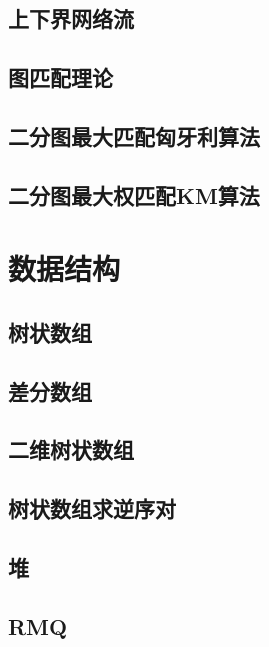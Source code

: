 \section{上下界网络流}
\raggedbottom
\hrulefill
\section{图匹配理论}
\raggedbottom
\hrulefill
\section{二分图最大匹配匈牙利算法}
\raggedbottom
\hrulefill
\section{二分图最大权匹配KM算法}
\raggedbottom
\hrulefill

\chapter{数据结构}
\section{树状数组}
\raggedbottom
\hrulefill
\section{差分数组}
\raggedbottom
\hrulefill
\section{二维树状数组}
\raggedbottom
\hrulefill
\section{树状数组求逆序对}
\raggedbottom
\hrulefill
\section{堆}
\raggedbottom
\hrulefill
\section{RMQ}
\raggedbottom
\hrulefill
